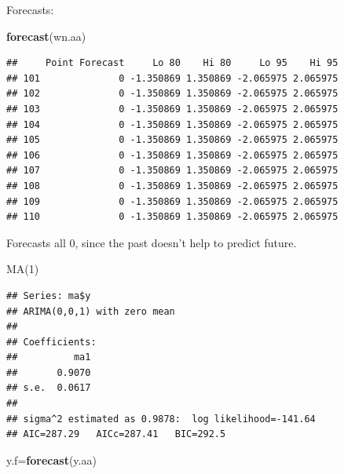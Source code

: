 \documentclass[
  ignorenonframetext,
]{beamer}
\newenvironment{Shaded}{\begin{snugshade}}{\end{snugshade}}
\newcommand{\KeywordTok}[1]{\textcolor[rgb]{0.13,0.29,0.53}{\textbf{#1}}}
\newcommand{\NormalTok}[1]{#1}
\newcommand{\OperatorTok}[1]{\textcolor[rgb]{0.81,0.36,0.00}{\textbf{#1}}}
\begin{document}
\begin{frame}[fragile]{Forecasts:}
\protect\hypertarget{forecasts}{}

\small

\begin{Shaded}
\begin{Highlighting}[]
\KeywordTok{forecast}\NormalTok{(wn.aa)}
\end{Highlighting}
\end{Shaded}

\begin{verbatim}
##     Point Forecast     Lo 80    Hi 80     Lo 95    Hi 95
## 101              0 -1.350869 1.350869 -2.065975 2.065975
## 102              0 -1.350869 1.350869 -2.065975 2.065975
## 103              0 -1.350869 1.350869 -2.065975 2.065975
## 104              0 -1.350869 1.350869 -2.065975 2.065975
## 105              0 -1.350869 1.350869 -2.065975 2.065975
## 106              0 -1.350869 1.350869 -2.065975 2.065975
## 107              0 -1.350869 1.350869 -2.065975 2.065975
## 108              0 -1.350869 1.350869 -2.065975 2.065975
## 109              0 -1.350869 1.350869 -2.065975 2.065975
## 110              0 -1.350869 1.350869 -2.065975 2.065975
\end{verbatim}

\normalsize

Forecasts all 0, since the past doesn't help to predict future.

\end{frame}

\begin{frame}[fragile]{MA(1)}
\protect\hypertarget{ma1}{}

\begin{Shaded}
\end{Shaded}

\begin{verbatim}
## Series: ma$y 
## ARIMA(0,0,1) with zero mean 
## 
## Coefficients:
##          ma1
##       0.9070
## s.e.  0.0617
## 
## sigma^2 estimated as 0.9878:  log likelihood=-141.64
## AIC=287.29   AICc=287.41   BIC=292.5
\end{verbatim}

\begin{Shaded}
\begin{Highlighting}[]
\NormalTok{y.f=}\KeywordTok{forecast}\NormalTok{(y.aa)}
\end{Highlighting}
\end{Shaded}

\end{frame}
\end{document}
